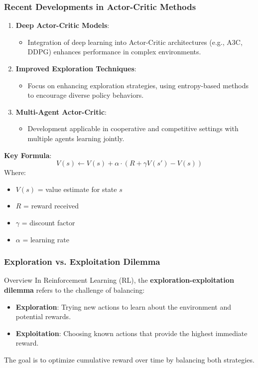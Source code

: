 \documentclass[aspectratio=169]{beamer}
\begin{document}
\begin{frame}[fragile]
    \frametitle{Recent Developments in Actor-Critic Methods}
    \begin{enumerate}
        \item \textbf{Deep Actor-Critic Models}:
        \begin{itemize}
            \item Integration of deep learning into Actor-Critic architectures (e.g., A3C, DDPG) enhances performance in complex environments.
        \end{itemize}
        
        \item \textbf{Improved Exploration Techniques}:
        \begin{itemize}
            \item Focus on enhancing exploration strategies, using entropy-based methods to encourage diverse policy behaviors.
        \end{itemize}
        
        \item \textbf{Multi-Agent Actor-Critic}:
        \begin{itemize}
            \item Development applicable in cooperative and competitive settings with multiple agents learning jointly.
        \end{itemize}
    \end{enumerate}

    \textbf{Key Formula}:
    \begin{equation}
    V(s) \leftarrow V(s) + \alpha \cdot (R + \gamma V(s') - V(s))
    \end{equation}
    Where:
    \begin{itemize}
        \item \( V(s) \) = value estimate for state \( s \)
        \item \( R \) = reward received
        \item \( \gamma \) = discount factor
        \item \( \alpha \) = learning rate
    \end{itemize}
\end{frame}

\begin{frame}[fragile]
    \frametitle{Exploration vs. Exploitation Dilemma}
    \begin{block}{Overview}
        In Reinforcement Learning (RL), the \textbf{exploration-exploitation dilemma} refers to the challenge of balancing:
        \begin{itemize}
            \item \textbf{Exploration}: Trying new actions to learn about the environment and potential rewards.
            \item \textbf{Exploitation}: Choosing known actions that provide the highest immediate reward.
        \end{itemize}
        The goal is to optimize cumulative reward over time by balancing both strategies.
    \end{block}
\end{frame}
\end{document}
